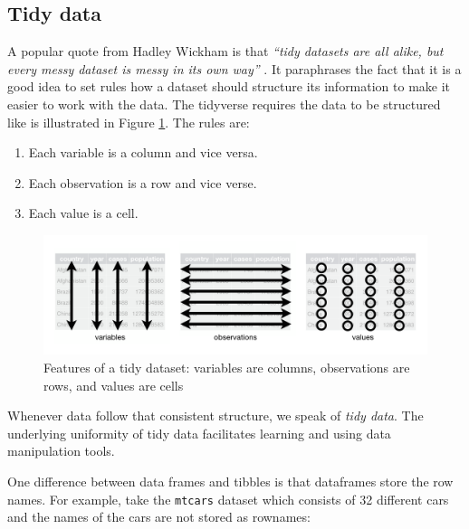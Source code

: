 \documentclass[
  12pt,
  oneside]{book}
\providecommand{\tightlist}{%
  \setlength{\itemsep}{0pt}\setlength{\parskip}{0pt}}
\theoremstyle{definition}
\theoremstyle{definition}
\theoremstyle{definition}
\theoremstyle{definition}
\theoremstyle{remark}
\begin{document}
\hypertarget{tidy-data}{%
\subsection{Tidy data}\label{tidy-data}}

A popular quote from Hadley Wickham is that \emph{``tidy datasets are all alike, but every messy dataset is messy in its own way''} \citep[p.~2]{Hadley2014Tidy}. It paraphrases the fact that it is a good idea to set rules how a dataset should structure its information to make it easier to work with the data. The tidyverse requires the data to be structured like is illustrated in Figure \ref{fig:tidy-1}. The rules are:

\begin{enumerate}
\def\labelenumi{\arabic{enumi}.}
\tightlist
\item
  Each variable is a column and vice versa.
\item
  Each observation is a row and vice verse.
\item
  Each value is a cell.
\end{enumerate}

\begin{figure}
\centering
\includegraphics[width=1\textwidth,height=\textheight]{fig/tidy-1.png}
\caption[\label{fig:tidy-1} Features of a tidy dataset: variables are columns, observations are rows, and values are cells]{\label{fig:tidy-1} Features of a tidy dataset: variables are columns, observations are rows, and values are cells\footnotemark{}}
\end{figure}

Whenever data follow that consistent structure, we speak of \emph{tidy data}. The underlying uniformity of tidy data facilitates learning and using data manipulation tools.

One difference between data frames and tibbles is that dataframes store the row names. For example, take the \texttt{mtcars} dataset which consists of 32 different cars and the names of the cars are not stored as rownames:
\end{document}
